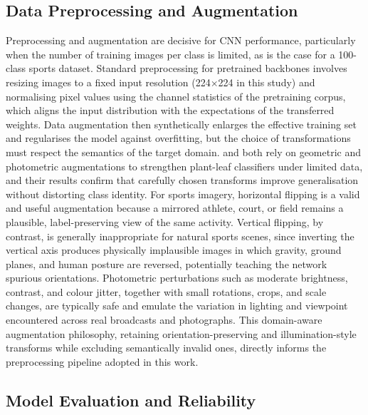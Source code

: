 \subsection{Data Preprocessing and Augmentation}
\label{subsec:preprocaug}

Preprocessing and augmentation are decisive for CNN performance, particularly when the number of training images per class is limited, as is the case for a 100-class sports dataset.
Standard preprocessing for pretrained backbones involves resizing images to a fixed input resolution (224$\times$224 in this study) and normalising pixel values using the channel statistics of the pretraining corpus, which aligns the input distribution with the expectations of the transferred weights.
Data augmentation then synthetically enlarges the effective training set and regularises the model against overfitting, but the choice of transformations must respect the semantics of the target domain.
\citet{foysal2024plantleaf} and \citet{karim2024grapeleaf} both rely on geometric and photometric augmentations to strengthen plant-leaf classifiers under limited data, and their results confirm that carefully chosen transforms improve generalisation without distorting class identity.
For sports imagery, horizontal flipping is a valid and useful augmentation because a mirrored athlete, court, or field remains a plausible, label-preserving view of the same activity.
Vertical flipping, by contrast, is generally inappropriate for natural sports scenes, since inverting the vertical axis produces physically implausible images in which gravity, ground planes, and human posture are reversed, potentially teaching the network spurious orientations.
Photometric perturbations such as moderate brightness, contrast, and colour jitter, together with small rotations, crops, and scale changes, are typically safe and emulate the variation in lighting and viewpoint encountered across real broadcasts and photographs.
This domain-aware augmentation philosophy, retaining orientation-preserving and illumination-style transforms while excluding semantically invalid ones, directly informs the preprocessing pipeline adopted in this work.

\subsection{Model Evaluation and Reliability}
\label{subsec:evaluation}

